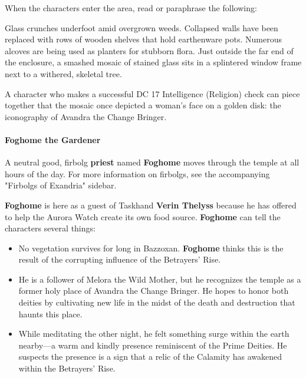 \documentclass[a4paper, 11pt, bg=full, twocolumn, nooutline]{dndbook}
\begin{document}
When the characters enter the area, read or paraphrase the following:

\begin{DndReadAloud}
Glass crunches underfoot amid overgrown weeds. Collapsed walls have been replaced with rows of wooden shelves that hold earthenware pots. Numerous alcoves are being used as planters for stubborn flora. Just outside the far end of the enclosure, a smashed mosaic of stained glass sits in a splintered window frame next to a withered, skeletal tree.
\end{DndReadAloud}

A character who makes a successful DC 17 Intelligence (Religion) check can piece together that the mosaic once depicted a woman's face on a golden disk: the iconography of Avandra the Change Bringer.

\paragraph{Foghome the Gardener}

A neutral good, firbolg \textbf{priest} named \textbf{Foghome} moves through the temple at all hours of the day. For more information on firbolgs, see the accompanying "Firbolgs of Exandria" sidebar.


\textbf{Foghome} is here as a guest of Taskhand \textbf{Verin Thelyss} because he has offered to help the Aurora Watch create its own food source. \textbf{Foghome} can tell the characters several things:

\begin{itemize}
\item No vegetation survives for long in Bazzoxan. \textbf{Foghome} thinks this is the result of the corrupting influence of the Betrayers' Rise.
\item He is a follower of Melora the Wild Mother, but he recognizes the temple as a former holy place of Avandra the Change Bringer. He hopes to honor both deities by cultivating new life in the midst of the death and destruction that haunts this place.
\item While meditating the other night, he felt something surge within the earth nearby---a warm and kindly presence reminiscent of the Prime Deities. He suspects the presence is a sign that a relic of the Calamity has awakened within the Betrayers' Rise.
\end{itemize}
\end{document}
